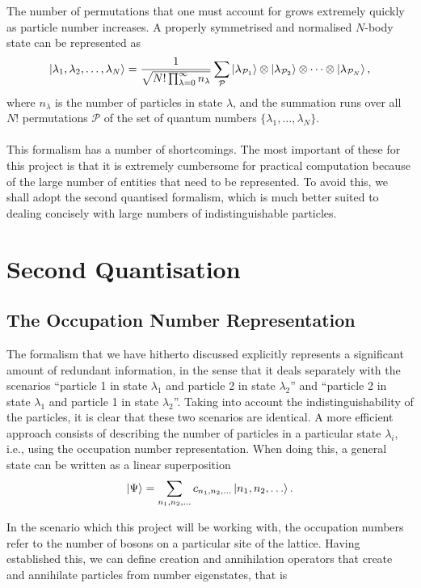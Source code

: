 \documentclass[a4paper,10pt]{article}
\begin{document}
The number of permutations that one must account for grows extremely quickly as particle number increases. A properly symmetrised and normalised $N$-body state can be
represented as \cite{Altland2010}
\begin{equation}
 \ket{\lambda_1,\lambda_2,\dots,\lambda_N}=\frac{1}{\sqrt{N!\prod_{\lambda=0}^{\infty}{n_{\lambda}}}}
 \sum_{\mathcal{P}}\ket{\lambda_{\mathcal{P}_1}}\otimes \ket{\lambda_{\mathcal{P}_2}}\otimes\dots\otimes\ket{\lambda_{\mathcal{P}_N}},
\end{equation}
where $n_{\lambda}$ is the number of particles in state $\lambda$, and the summation runs over all $N!$ permutations $\mathcal{P}$ of the set of quantum numbers $\{ \lambda_1,\dots,\lambda_N\}$.
\\\\
This formalism has a number of shortcomings. The most important of these for this project is that it is extremely cumbersome for practical computation because of the large number of entities that need to be 
represented. To avoid this, we shall adopt the second quantised formalism, which is much better suited to dealing concisely with large numbers of indistinguishable particles.
\newpage
\section{Second Quantisation}
\subsection{The Occupation Number Representation}
The formalism that we have hitherto discussed explicitly represents a significant amount of redundant information, in the sense that it deals separately with the scenarios ``particle 1 in state $\lambda_1$ and 
particle 2 in state $\lambda_2$'' and ``particle 2 in state $\lambda_1$ and particle 1 in state $\lambda_2$''. Taking into account the indistinguishability of the particles, it is clear that these two scenarios
are identical. A more efficient approach consists of describing the number of particles in a particular state $\lambda_i$, i.e., using the occupation number representation. When doing this, a general 
state can be written as a linear superposition
\begin{equation}
 \ket{\Psi}=\sum_{n_1,n_2,\dots}c_{n_1,n_2,\dots}\ket{n_1,n_2,\dots}.
\end{equation}

In the scenario which this project will be working with, the occupation numbers refer to the number of bosons on a particular site of the lattice.
Having established this, we can define creation and annihilation operators that create and annihilate particles from number eigenstates, that is
\end{document}
